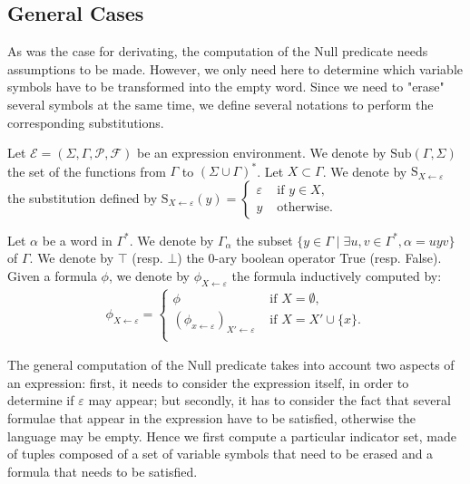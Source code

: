 \documentclass[a4paper]{llncs}
\begin{document}
  \subsection{General Cases}
  
  As was the case for derivating, the computation of the $\mathrm{Null}$ predicate  needs assumptions to be made. However, we only need here to determine which variable symbols have to be transformed into the empty word. Since we need to "erase" several symbols at the same time, we define several notations to perform the corresponding substitutions.
  
  Let $\mathcal{E}=(\Sigma,\Gamma,\mathcal{P},\mathcal{F})$ be an expression environment.
We denote by $\mathrm{Sub}(\Gamma,\Sigma)$ the set of the functions from $\Gamma$ to $(\Sigma\cup\Gamma)^*$. 
  Let $X\subset \Gamma$. We denote by $\mathrm{S}_{X\leftarrow\varepsilon}$ the substitution defined by 
  $\mathrm{S}_{X\leftarrow\varepsilon}(y)=
    \begin{cases}
        \varepsilon & \text{ if } y\in X,\\
        y & \text{ otherwise.}
      \end{cases}$
    


  Let $\alpha$ be a word in $\Gamma^*$. We denote by $\Gamma_\alpha$ the subset $\{y\in\Gamma\mid \exists u,v\in\Gamma^*, \alpha=uyv\}$ of $\Gamma$.  
  We denote by $\top$ (resp. $\bot$) the $0$-ary boolean operator True (resp. False).  
      Given a formula $\phi$, we denote by $\phi_{X\leftarrow\varepsilon}$ the formula inductively computed by:
        \begin{align*}
          \phi_{X\leftarrow \varepsilon}=
        \begin{cases}
            \phi & \text{ if }X=\emptyset,\\
            (\phi_{x\leftarrow \varepsilon})_{X'\leftarrow \varepsilon} & \text{ if } X=X'\cup\{x\}.\\
          \end{cases}
        \end{align*}
    
  The general computation of the $\mathrm{Null}$ predicate  takes into
account two aspects of an expression: first, it needs to consider the expression itself, in order to determine if $\varepsilon$ may appear; but secondly, it has to consider the fact that several formulae that appear in the expression have to be satisfied, otherwise the language may be empty. Hence we first compute a particular indicator set, made of 
tuples composed of a set of variable symbols that need to be erased and a formula that needs to be satisfied.
  
\end{document}
